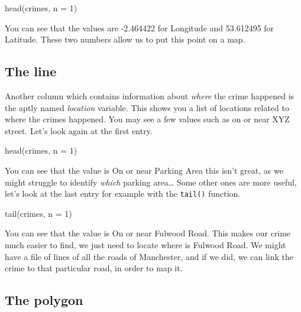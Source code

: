 \documentclass[
]{book}
\makeatletter
\newenvironment{Shaded}{\begin{snugshade}}{\end{snugshade}}
\newcommand{\AttributeTok}[1]{\textcolor[rgb]{0.61,0.61,0.61}{#1}}
\newcommand{\DecValTok}[1]{\textcolor[rgb]{0.06,0.06,0.06}{#1}}
\newcommand{\FunctionTok}[1]{\textcolor[rgb]{0,0,0}{#1}}
\newcommand{\NormalTok}[1]{#1}
\newenvironment{kframe}{%
\medskip{}
\setlength{\fboxsep}{.8em}
 \def\at@end@of@kframe{}%
 \ifinner\ifhmode%
  \def\at@end@of@kframe{\end{minipage}}%
  \begin{minipage}{\columnwidth}%
 \fi\fi%
 \def\FrameCommand##1{\hskip\@totalleftmargin \hskip-\fboxsep
 \colorbox{shadecolor}{##1}\hskip-\fboxsep
     \hskip-\linewidth \hskip-\@totalleftmargin \hskip\columnwidth}%
 \MakeFramed {\advance\hsize-\width
   \@totalleftmargin\z@ \linewidth\hsize
   \@setminipage}}%
 {\par\unskip\endMakeFramed%
 \at@end@of@kframe}
\renewenvironment{Shaded}{\begin{kframe}}{\end{kframe}}
\makeatother
\begin{document}
\begin{Shaded}
\begin{Highlighting}[]
\FunctionTok{head}\NormalTok{(crimes, }\AttributeTok{n =} \DecValTok{1}\NormalTok{)}
\end{Highlighting}
\end{Shaded}

You can see that the values are -2.464422 for Longitude and 53.612495 for Latitude. These two numbers allow us to put this point on a map.

\hypertarget{the-line}{%
\subsection{The line}\label{the-line}}

Another column which contains information about \emph{where} the crime happened is the aptly named \emph{location} variable. This shows you a list of locations related to where the crimes happened. You may see a few values such as on or near XYZ street. Let's look again at the first entry.

\begin{Shaded}
\begin{Highlighting}[]
\FunctionTok{head}\NormalTok{(crimes, }\AttributeTok{n =} \DecValTok{1}\NormalTok{)}
\end{Highlighting}
\end{Shaded}

You can see that the value is On or near Parking Area this isn't great, as we might struggle to identify \emph{which} parking area\ldots{} Some other ones are more useful, let's look at the last entry for example with the \texttt{tail()} function.

\begin{Shaded}
\begin{Highlighting}[]
\FunctionTok{tail}\NormalTok{(crimes, }\AttributeTok{n =} \DecValTok{1}\NormalTok{)}
\end{Highlighting}
\end{Shaded}

You can see that the value is On or near Fulwood Road. This makes our crime much easier to find, we just need to locate where is Fulwood Road. We might have a file of lines of all the roads of Manchester, and if we did, we can link the crime to that particular road, in order to map it.

\hypertarget{the-polygon}{%
\subsection{The polygon}\label{the-polygon}}
\end{document}
